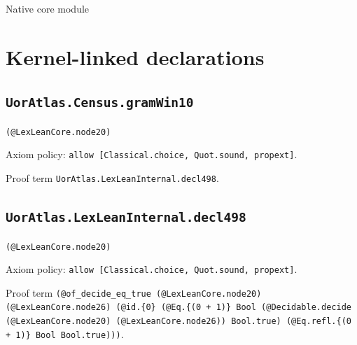 \documentclass[11pt]{article}
\begin{document}
\begin{center}{\LARGE Native core module}\end{center}
\section*{Kernel-linked declarations}
\subsection*{\texttt{UorAtlas.Census.gramWin10}}
\noindent\texttt{(@LexLeanCore.node20)}\par
\noindent Axiom policy: \texttt{allow [Classical.choice, Quot.sound, propext]}.\par
\noindent Proof term \texttt{UorAtlas.LexLeanInternal.decl498}.\par
\subsection*{\texttt{UorAtlas.LexLeanInternal.decl498}}
\noindent\texttt{(@LexLeanCore.node20)}\par
\noindent Axiom policy: \texttt{allow [Classical.choice, Quot.sound, propext]}.\par
\noindent Proof term \texttt{(@of\_decide\_eq\_true (@LexLeanCore.node20) (@LexLeanCore.node26) (@id.\{0\} (@Eq.\{(0 + 1)\} Bool (@Decidable.decide (@LexLeanCore.node20) (@LexLeanCore.node26)) Bool.true) (@Eq.refl.\{(0 + 1)\} Bool Bool.true)))}.\par
\end{document}
